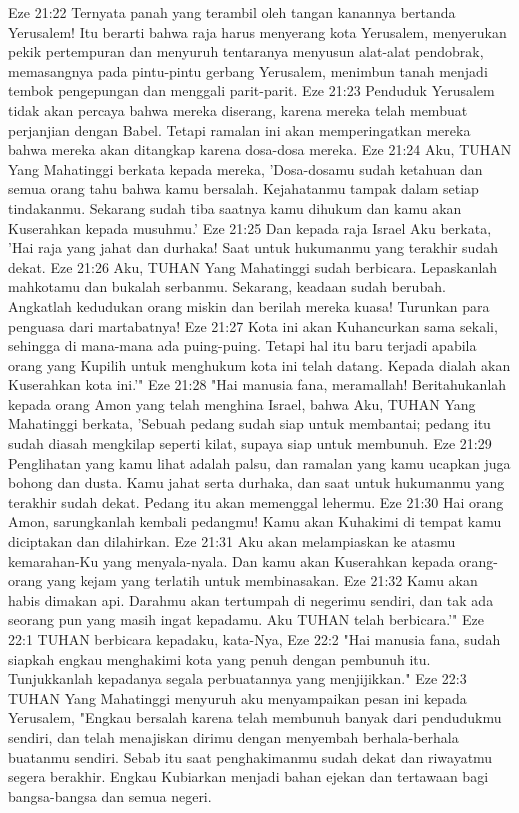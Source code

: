Eze 21:22  Ternyata panah yang terambil oleh tangan kanannya bertanda Yerusalem! Itu berarti bahwa raja harus menyerang kota Yerusalem, menyerukan pekik pertempuran dan menyuruh tentaranya menyusun alat-alat pendobrak, memasangnya pada pintu-pintu gerbang Yerusalem, menimbun tanah menjadi tembok pengepungan dan menggali parit-parit.
Eze 21:23  Penduduk Yerusalem tidak akan percaya bahwa mereka diserang, karena mereka telah membuat perjanjian dengan Babel. Tetapi ramalan ini akan memperingatkan mereka bahwa mereka akan ditangkap karena dosa-dosa mereka.
Eze 21:24  Aku, TUHAN Yang Mahatinggi berkata kepada mereka, 'Dosa-dosamu sudah ketahuan dan semua orang tahu bahwa kamu bersalah. Kejahatanmu tampak dalam setiap tindakanmu. Sekarang sudah tiba saatnya kamu dihukum dan kamu akan Kuserahkan kepada musuhmu.'
Eze 21:25  Dan kepada raja Israel Aku berkata, 'Hai raja yang jahat dan durhaka! Saat untuk hukumanmu yang terakhir sudah dekat.
Eze 21:26  Aku, TUHAN Yang Mahatinggi sudah berbicara. Lepaskanlah mahkotamu dan bukalah serbanmu. Sekarang, keadaan sudah berubah. Angkatlah kedudukan orang miskin dan berilah mereka kuasa! Turunkan para penguasa dari martabatnya!
Eze 21:27  Kota ini akan Kuhancurkan sama sekali, sehingga di mana-mana ada puing-puing. Tetapi hal itu baru terjadi apabila orang yang Kupilih untuk menghukum kota ini telah datang. Kepada dialah akan Kuserahkan kota ini.'"
Eze 21:28  "Hai manusia fana, meramallah! Beritahukanlah kepada orang Amon yang telah menghina Israel, bahwa Aku, TUHAN Yang Mahatinggi berkata, 'Sebuah pedang sudah siap untuk membantai; pedang itu sudah diasah mengkilap seperti kilat, supaya siap untuk membunuh.
Eze 21:29  Penglihatan yang kamu lihat adalah palsu, dan ramalan yang kamu ucapkan juga bohong dan dusta. Kamu jahat serta durhaka, dan saat untuk hukumanmu yang terakhir sudah dekat. Pedang itu akan memenggal lehermu.
Eze 21:30  Hai orang Amon, sarungkanlah kembali pedangmu! Kamu akan Kuhakimi di tempat kamu diciptakan dan dilahirkan.
Eze 21:31  Aku akan melampiaskan ke atasmu kemarahan-Ku yang menyala-nyala. Dan kamu akan Kuserahkan kepada orang-orang yang kejam yang terlatih untuk membinasakan.
Eze 21:32  Kamu akan habis dimakan api. Darahmu akan tertumpah di negerimu sendiri, dan tak ada seorang pun yang masih ingat kepadamu. Aku TUHAN telah berbicara.'"
Eze 22:1  TUHAN berbicara kepadaku, kata-Nya,
Eze 22:2  "Hai manusia fana, sudah siapkah engkau menghakimi kota yang penuh dengan pembunuh itu. Tunjukkanlah kepadanya segala perbuatannya yang menjijikkan."
Eze 22:3  TUHAN Yang Mahatinggi menyuruh aku menyampaikan pesan ini kepada Yerusalem, "Engkau bersalah karena telah membunuh banyak dari pendudukmu sendiri, dan telah menajiskan dirimu dengan menyembah berhala-berhala buatanmu sendiri. Sebab itu saat penghakimanmu sudah dekat dan riwayatmu segera berakhir. Engkau Kubiarkan menjadi bahan ejekan dan tertawaan bagi bangsa-bangsa dan semua negeri.
